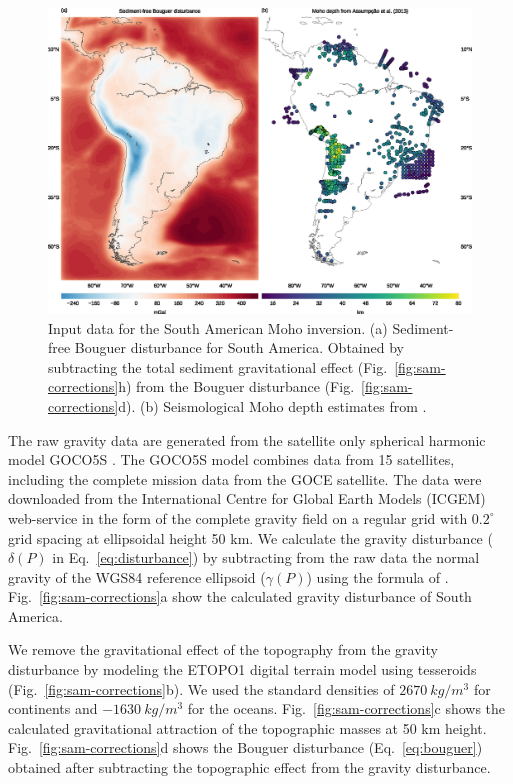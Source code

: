 \documentclass[extra,mreferee]{gji}
\begin{document}
\begin{figure}
    \centering
    \includegraphics[width=\textwidth]{figures/south-america-data}
    \caption{
        Input data for the South American Moho inversion.
        (a) Sediment-free Bouguer disturbance for South America.
        Obtained by subtracting the total sediment gravitational effect
        (Fig.~\ref{fig:sam-corrections}h) from the Bouguer disturbance
        (Fig.~\ref{fig:sam-corrections}d).
        (b) Seismological Moho depth estimates from
        \citet{assumpcao2013a}.
    }
    \label{fig:sam-data}
\end{figure}


The raw gravity data are generated from the satellite only
spherical harmonic model GOCO5S \citet{mayer-guerr2015}.
The GOCO5S model combines data from 15 satellites, including the complete
mission data from the GOCE satellite.
The data were downloaded from the
International Centre for Global Earth Models (ICGEM) web-service
\citep[][ \url{http://icgem.gfz-potsdam.de/ICGEM/})]{barthelmes2012}
in the form of the complete gravity field
on a regular grid with $0.2^\circ$ grid spacing at ellipsoidal height 50 km.
We calculate the gravity disturbance
($\delta(P)$ in Eq.~\ref{eq:disturbance})
by subtracting from the raw data
the normal gravity of the WGS84 reference ellipsoid ($\gamma(P)$)
using the formula of \citet{li2001a}.
Fig.~\ref{fig:sam-corrections}a show the calculated gravity disturbance of
South America.

We remove the gravitational effect of the topography
from the gravity disturbance
by modeling the ETOPO1 digital terrain model
\citep[][ \url{http://dx.doi.org/10.7289/V5C8276M}]{amante2009}
using tesseroids (Fig.~\ref{fig:sam-corrections}b).
We used the standard densities of $2670\ kg/m^3$ for continents and
$-1630\ kg/m^3$ for the oceans.
Fig.~\ref{fig:sam-corrections}c shows the calculated gravitational attraction
of the topographic masses at 50 km height.
Fig.~\ref{fig:sam-corrections}d shows the Bouguer disturbance
(Eq.~\ref{eq:bouguer}) obtained after subtracting the topographic effect from
the gravity disturbance.
\end{document}
